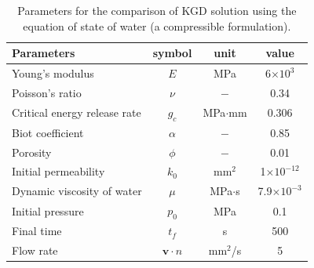 \documentclass{elsarticle}
\begin{document}
\begin{table}[htbp]
	\centering
	\caption{Parameters for the comparison of KGD solution using the equation of state of water (a compressible formulation).}
	\begin{tabular}{l c c c}
		\hline 
		Parameters & symbol & unit& value \\
		\hline 
		Young's modulus & $E$ &MPa&  6$\times 10^{3}$\\
		Poisson's ratio & $\nu$ &$-$&  0.34\\
		Critical energy release rate & $g_c$ &MPa$\cdot$mm&  0.306\\
		Biot coefficient & $\alpha$ &$-$&  0.85\\
		Porosity & $\phi$ &$-$&  0.01\\
		Initial permeability & $k_0$ &mm$^2$&  1$\times 10^{-12}$\\
		Dynamic viscosity of water & $\mu$ & MPa$\cdot$s& 7.9$\times 10^{-3}$\\
		Initial pressure & $p_0$ &MPa& 0.1\\
		Final time &$t_f$ & s &  500\\
		Flow rate &${\bm{v}} \cdot n$ & mm$^2$/s & 5\\
		\hline     
	\end{tabular}
	\label{Tab:asymptotic_input}
\end{table}

\end{document}
